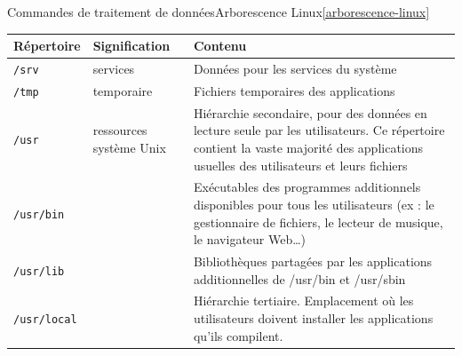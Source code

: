 \documentclass{beamer}
\begin{document}
    \begin{frame}{Commandes de traitement de données}{Arborescence Linux\cref{arborescence-linux}}
        \begin{tiny}
            \begin{table}[h!]
                \centering
                \begin{tabular}{|l|p{3cm}|p{6cm}|}
                    \hline
                    \textbf{Répertoire}    & \textbf{Signification}  & \textbf{Contenu}                                                                                                                                                                     \\
                    \hline
                    \lstinline{/srv}       & services                & Données pour les services du système                                                                                                                                                 \\
                    \hline
                    \lstinline{/tmp}       & temporaire              & Fichiers temporaires des applications                                                                                                                                                \\
                    \hline
                    \lstinline{/usr}       & ressources système Unix & Hiérarchie secondaire, pour des données en lecture seule par les utilisateurs. Ce répertoire contient la vaste majorité des applications usuelles des utilisateurs et leurs fichiers \\
                    \hline
                    \lstinline{/usr/bin}   &                         & Exécutables des programmes additionnels disponibles pour tous les utilisateurs (ex : le gestionnaire de fichiers, le lecteur de musique, le navigateur Web…)                         \\
                    \hline
                    \lstinline{/usr/lib}   &                         & Bibliothèques partagées par les applications additionnelles de /usr/bin et /usr/sbin                                                                                                 \\
                    \hline
                    \lstinline{/usr/local} &                         & Hiérarchie tertiaire. Emplacement où les utilisateurs doivent installer les applications qu'ils compilent.                                                                           \\

\end{tabular}
\end{table}
\end{tiny}
\end{frame}
\end{document}
